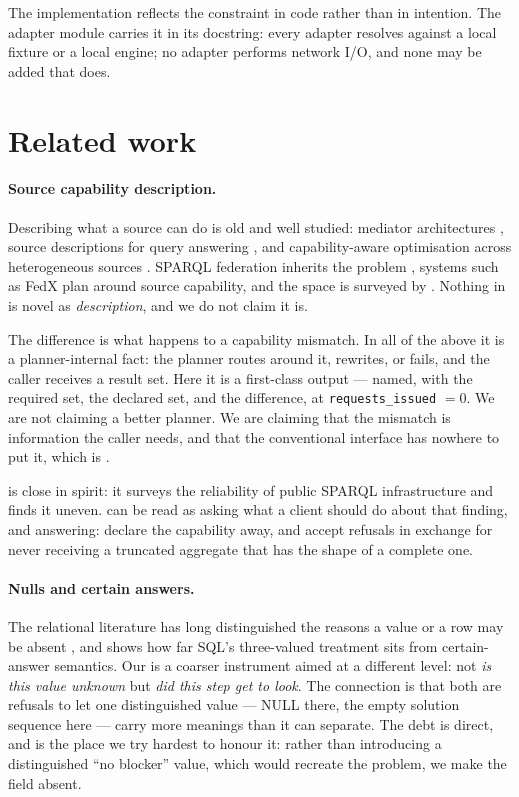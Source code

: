 \documentclass[11pt,a4paper]{article}
\theoremstyle{plain}
\theoremstyle{definition}
\theoremstyle{remark}
\begin{document}
The implementation reflects the constraint in code rather than in
intention. The adapter module carries it in its docstring: every adapter
resolves against a local fixture or a local engine; no adapter performs
network I/O, and none may be added that does.

\section{Related work}
\label{sec:related}

\paragraph{Source capability description.} Describing what a source can
do is old and well studied: mediator architectures
\citep{Wiederhold1992}, source descriptions for query answering
\citep{Levy1996}, and capability-aware optimisation across heterogeneous
sources \citep{Haas1997}. SPARQL federation inherits the problem
\citep{Prudhommeaux2013}, systems such as FedX \citep{Schwarte2011} plan
around source capability, and the space is surveyed by
\citet{Saleem2016}. Nothing in  is novel as
\emph{description}, and we do not claim it is.

The difference is what happens to a capability mismatch. In all of the
above it is a planner-internal fact: the planner routes around it,
rewrites, or fails, and the caller receives a result set. Here it is a
first-class output --- named, with the required set, the declared set,
and the difference, at \texttt{requests\_issued} $= 0$. We are not
claiming a better planner. We are claiming that the mismatch is
information the caller needs, and that the conventional interface has
nowhere to put it, which is .

\citet{Aranda2013} is close in spirit: it surveys the reliability of
public SPARQL infrastructure and finds it uneven.  can
be read as asking what a client should do about that finding, and
answering: declare the capability away, and accept refusals in exchange
for never receiving a truncated aggregate that has the shape of a
complete one.

\paragraph{Nulls and certain answers.} The relational literature has
long distinguished the reasons a value or a row may be absent
\citep{Codd1979,Imielinski1984}, and \citet{Libkin2016} shows how far
SQL's three-valued treatment sits from certain-answer semantics. Our
 is a coarser instrument aimed at a different level: not
\emph{is this value unknown} but \emph{did this step get to look}. The
connection is that both are refusals to let one distinguished value ---
NULL there, the empty solution sequence here --- carry more meanings
than it can separate. The debt is direct, and  is
the place we try hardest to honour it: rather than introducing a
distinguished ``no blocker'' value, which would recreate the problem, we
make the field absent.
\end{document}
